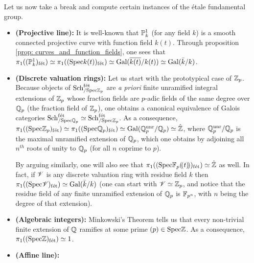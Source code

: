         Let us now take a break and compute certain instances of the \'etale fundamental group.
        \begin{example} \label{example: etale_fundamental_groups}
            \noindent
            \begin{itemize}
                \item \textbf{(Projective line):} It is well-known that $\P^1_k$ (for any field $k$) is a smooth connected projective curve with function field $k(t)$. Through proposition \ref{prop: curves_and_function_fields}, one sees that $\pi_1((\P^1_k)_{\fet}) \cong \pi_1((\Spec k(t))_{\fet}) \cong \Gal(\overline{k(t)}/k(t)) \cong \Gal(\bar{k}/k)$.
                \item \textbf{(Discrete valuation rings):} Let us start with the prototypical case of $\Z_p$. Because objects of $\Sch_{/\Spec \Z_p}^{\fet}$ are \textit{a priori} finite unramified integral extensions of $\Z_p$ whose fraction fields are $p$-adic fields of the same degree over $\Q_p$ (the fraction field of $\Z_p$), one obtains a canonical equivalence of Galois categories $\Sch_{/\Spec \Q_p}^{\fet} \cong \Sch_{/\Spec \Z_p}^{\fet}$. As a consequence, $\pi_1((\Spec \Z_p)_{\fet}) \cong \pi_1((\Spec \Q_p)_{\fet}) \cong \Gal(\Q_p^{\unr}/\Q_p) \cong \hat{\Z}$, where $\Q_p^{\unr}/\Q_p$ is the maximal unramified extension of $\Q_p$, which one obtains by adjoining all $n^{th}$ roots of unity to $\Q_p$ (for all $n$ coprime to $p$).
                
                By arguing similarly, one will also see that $\pi_1((\Spec \F_p(\!(t)\!))_{\fet}) \cong \hat{\Z}$ as well. In fact, if $\scrV$ is any discrete valuation ring with residue field $k$ then $\pi_1((\Spec \scrV)_{\fet}) \cong \Gal(\bar{k}/k)$ (one can start with $\scrV \cong \Z_p$, and notice that the residue field of any finite unramified extension of $\Q_p$ is $\F_{p^n}$, with $n$ being the degree of that extension).
                \item \textbf{(Algebraic integers):} Minkowski's Theorem tells us that every non-trivial finite extension of $\Q$ ramifies at some prime $(p) \in \Spec \Z$. As a consequence, $\pi_1((\Spec \Z)_{\fet}) \cong 1$.
                \item \textbf{(Affine line):} 
            \end{itemize}
        \end{example}
    

